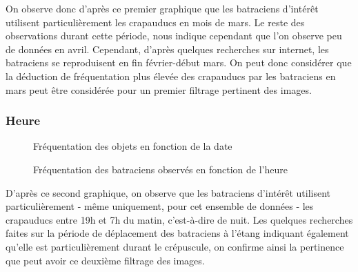 \noindent On observe donc d'après ce premier graphique que les batraciens d'intérêt utilisent particulièrement les crapauducs en mois de mars. Le reste des observations durant cette période, nous indique cependant que l'on observe peu de données en avril. \newline
Cependant, d'après quelques recherches sur internet, les batraciens se reproduisent en fin février-début mars. On peut donc considérer que la déduction de fréquentation plus élevée des crapauducs par les batraciens en mars peut être considérée pour un premier filtrage pertinent des images.

\subsubsection{Heure}

\begin{figure}[!htb]
    \centering
    \caption{Fréquentation des objets en fonction de la date}
    \label{fig:Fréquentation des objets en fonction de la date}
\end{figure}

\begin{figure}[!htb]
    \centering
    \caption{Fréquentation des batraciens observés en fonction de l'heure}
    \label{fig:Fréquentation des crapauducs en fonction de l'heure}
\end{figure}

\noindent D'après ce second graphique, on observe que les batraciens d'intérêt utilisent particulièrement - même uniquement, pour cet ensemble de données - les crapauducs entre 19h et 7h du matin, c'est-à-dire de nuit.\newline
Les quelques recherches faites sur la période de déplacement des batraciens à l'étang indiquant également qu'elle est particulièrement durant le crépuscule, on confirme ainsi la pertinence que peut avoir ce deuxième filtrage des images.

